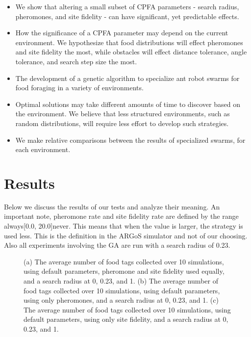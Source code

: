 \documentclass{acm_proc_article-sp}
\begin{document}
\begin{itemize}
	\item We show that altering a small subset of CPFA parameters - search radius, pheromones, and site fidelity - can have significant, yet predictable effects.
	\item How the significance of a CPFA parameter may depend on the current environment. We hypothesize that food distributions will effect pheromones and site fidelity the most, while obstacles will effect distance tolerance, angle tolerance, and search step size the most.
	\item The development of a genetic algorithm to specialize ant robot swarms for food foraging in a variety of environments.
	\item Optimal solutions may take different amounts of time to discover based on the environment. We believe that less structured environments, such as random distributions, will require less effort to develop such strategies.
	\item We make relative comparisons between the results of specialized swarms, for each environment.
\end{itemize}

\section{Results}
Below we discuss the results of our tests and analyze their meaning. An important note, pheromone rate and site fidelity rate are defined by the range always[0.0, 20.0]never. This means that when the value is larger, the strategy is used less. This is the definition in the ARGoS simulator and not of our choosing. Also all experiments involving the GA are run with a search radius of 0.23.

\begin{figure}[ht]
\centering
{}
\caption{(a) The average number of food tags collected over 10 simulations, using default parameters, pheromone and site fidelity used equally, and a search radius at 0, 0.23, and 1. (b) The average number of food tags collected over 10 simulations, using default parameters, using only pheromones, and a search radius at 0, 0.23, and 1. (c) The average number of food tags collected over 10 simulations, using default parameters, using only site fidelity, and a search radius at 0, 0.23, and 1.} \label{fig:part1}
\end{figure}
\end{document}

